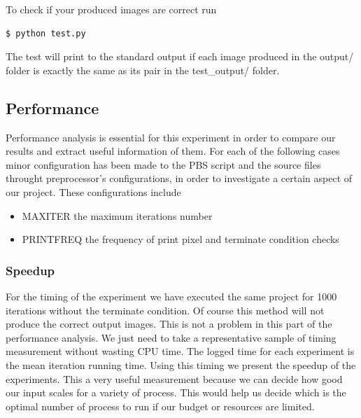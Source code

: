 \documentclass[12pt,a4paper]{article}
\begin{document}
        To check if your produced images are correct run
        \begin{lstlisting}[language=bash]
          $ python test.py
        \end{lstlisting}

        The test will print to the standard output if each image produced in the output/ folder is exactly the same as its pair in the test\_output/ folder.

    \subsection{Performance}
        Performance analysis is essential for this experiment in order to compare our results and extract useful information of them. For each of the following cases minor configuration has been made to the PBS script and the source files throught preprocessor's configurations, in order to investigate a certain aspect of our project. These configurations include 

        \begin{itemize}
          \item MAXITER the maximum iterations number
          \item PRINTFREQ the frequency of print pixel and terminate condition checks
        \end{itemize}

        \subsubsection{Speedup}
          For the timing of the experiment we have executed the same project for 1000 iterations without the terminate condition. Of course this method will not produce the correct output images. This is not a problem in this part of the performance analysis. We just need to take a representative sample of timing measurement without wasting CPU time. The logged time for each experiment is the mean iteration running time. Using this timing we present the speedup of the experiments. This a very useful measurement because we can decide how good our input scales for a variety of process. This would help us decide which is the optimal number of process to run if our budget or resources are limited.
\end{document}
